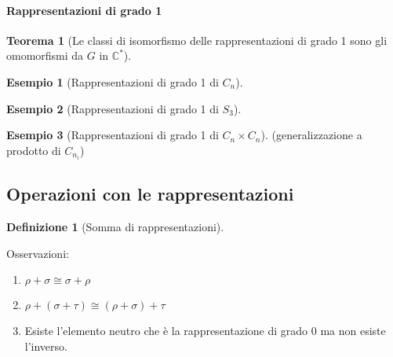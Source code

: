 \documentclass[11pt]{article}
\theoremstyle{plain}
\newtheorem{thm}{Teorema}[section]
\theoremstyle{definition}
\newtheorem{defn}{Definizione}[section]
\newtheorem{exmp}{Esempio}[section]
\theoremstyle{remark}
\newcommand{\C}{\mathbb{C}}
\begin{document}
\paragraph{Rappresentazioni di grado 1}

\begin{thm}[Le classi di isomorfismo delle rappresentazioni di grado 1 sono gli omomorfismi da $G$ in $\C^*$]


\end{thm}


\begin{exmp}[Rappresentazioni di grado 1 di $C_n$]

\end{exmp}


\begin{exmp}[Rappresentazioni di grado 1 di $S_3$]

\end{exmp}

\begin{exmp}[Rappresentazioni di grado 1 di $C_n \times C_n$]


(generalizzazione a prodotto di $C_{n_i}$)
\end{exmp}














\newpage
\subsection{Operazioni con le rappresentazioni}

\begin{defn}[Somma di rappresentazioni]

\label{defn:somma di rappresentazioni}
\end{defn}

Osservazioni:

\begin{enumerate}
\item $\rho + \sigma \cong \sigma + \rho$
\item $\rho + (\sigma + \tau) \cong (\rho + \sigma ) + \tau$
\item Esiste l'elemento neutro che è la rappresentazione di grado 0 ma non esiste l'inverso.

\end{enumerate}
\end{document}
